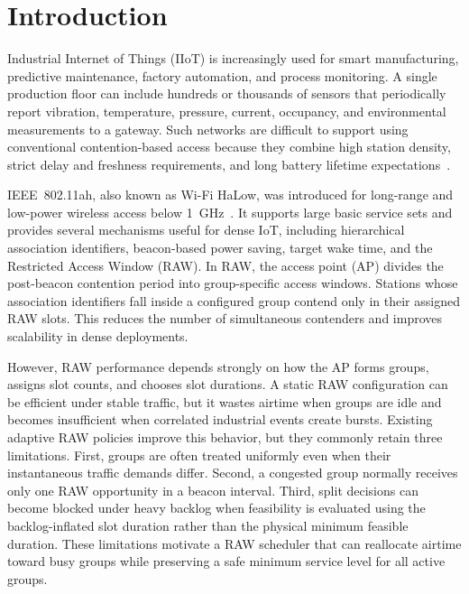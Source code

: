 \documentclass[journal]{IEEEtran}
\begin{document}
\section{Introduction}
\label{sec:intro}

 Industrial Internet of Things (IIoT) is increasingly
used for smart manufacturing, predictive maintenance, factory
automation, and process monitoring. A single production floor can
include hundreds or thousands of sensors that periodically report
vibration, temperature, pressure, current, occupancy, and environmental
measurements to a gateway. Such networks are difficult to support using
conventional contention-based access because they combine high station
density, strict delay and freshness requirements, and long battery
lifetime expectations~\cite{chen2017iiot,Sisinni2018}.

IEEE~802.11ah, also known as Wi-Fi HaLow, was introduced for long-range
and low-power wireless access below 1~GHz~\cite{std80211ah}. It supports
large basic service sets and provides several mechanisms useful for
dense IoT, including hierarchical association identifiers, beacon-based
power saving, target wake time, and the Restricted Access Window (RAW).
In RAW, the access point (AP) divides the post-beacon contention period
into group-specific access windows. Stations whose association
identifiers fall inside a configured group contend only in their
assigned RAW slots. This reduces the number of simultaneous contenders
and improves scalability in dense deployments.

However, RAW performance depends strongly on how the AP forms groups,
assigns slot counts, and chooses slot durations. A static RAW
configuration can be efficient under stable traffic, but it wastes
airtime when groups are idle and becomes insufficient when correlated
industrial events create bursts. Existing adaptive RAW policies improve
this behavior, but they commonly retain three limitations. First, groups
are often treated uniformly even when their instantaneous traffic
demands differ. Second, a congested group normally receives only one RAW
opportunity in a beacon interval. Third, split decisions can become
blocked under heavy backlog when feasibility is evaluated using the
backlog-inflated slot duration rather than the physical minimum feasible
duration. These limitations motivate a RAW scheduler that can reallocate
airtime toward busy groups while preserving a safe minimum service level
for all active groups.
\end{document}
